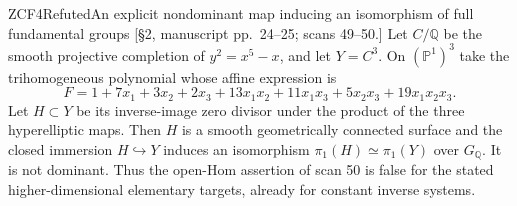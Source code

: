\begin{result}{ZCF4}{Refuted}{An explicit nondominant map inducing an isomorphism of full fundamental groups}
\textup{[\S2, manuscript pp.\ 24--25; scans 49--50.]}
Let $C/\mathbb Q$ be the smooth projective completion of
$y^2=x^5-x$, and let $Y=C^3$. On $(\mathbb P^1)^3$ take the
trihomogeneous polynomial whose affine expression is
\[
 F=1+7x_1+3x_2+2x_3+13x_1x_2+11x_1x_3
                     +5x_2x_3+19x_1x_2x_3.
\]
Let $H\subset Y$ be its inverse-image zero divisor under the product
of the three hyperelliptic maps. Then $H$ is a smooth geometrically
connected surface and the closed immersion $H\hookrightarrow Y$
induces an isomorphism $\pi_1(H)\simeq\pi_1(Y)$ over $G_{\mathbb Q}$.
It is not dominant. Thus the open-Hom assertion of scan 50 is false
for the stated higher-dimensional elementary targets, already for
constant inverse systems.
\end{result}
